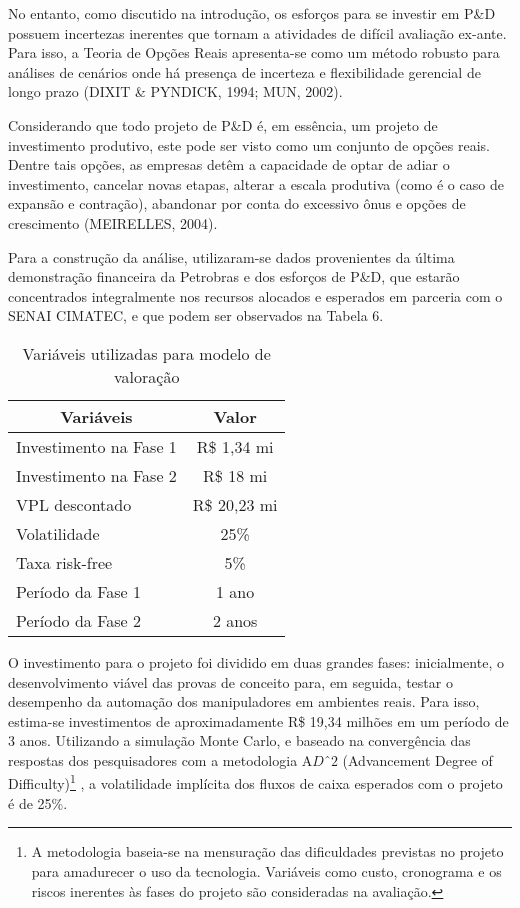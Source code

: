 No entanto, como discutido na introdução, os esforços para se investir em P\&D possuem incertezas inerentes que tornam a atividades de difícil avaliação ex-ante. Para isso, a Teoria de Opções Reais apresenta-se como um método robusto para análises de cenários onde há presença de incerteza e flexibilidade gerencial de longo prazo (DIXIT \& PYNDICK, 1994; MUN, 2002). 

Considerando que todo projeto de P\&D é, em essência, um projeto de investimento produtivo, este pode ser visto como um conjunto de opções reais. Dentre tais opções, as empresas detêm a capacidade de optar de adiar o investimento, cancelar novas etapas, alterar a escala produtiva (como é o caso de expansão e contração), abandonar por conta do excessivo ônus e opções de crescimento (MEIRELLES, 2004). 

Para a construção da análise, utilizaram-se dados provenientes da última demonstração financeira da Petrobras e dos esforços de P\&D, que estarão concentrados integralmente nos recursos alocados e esperados em parceria com o SENAI CIMATEC, e que podem ser observados na Tabela 6.

\begin{table}[h!]
	\centering
	\caption{Variáveis utilizadas para modelo de valoração}
	\label{tab:valor1}
	\def\arraystretch{1.2}
	\begin{tabular}{lc}
		\hline
		\multicolumn{1}{c}{\textbf{Variáveis}} & \textbf{Valor} \\ \hline
		Investimento na Fase 1                 & R\$ 1,34 mi    \\
		Investimento na Fase 2                 & R\$ 18 mi      \\
		VPL descontado                         & R\$ 20,23 mi   \\
		Volatilidade                           & 25\%           \\
		Taxa risk-free                         & 5\%            \\
		Período da Fase 1                      & 1 ano          \\
		Período da Fase 2                      & 2 anos         \\ \hline
	\end{tabular}
\end{table}

O investimento para o projeto foi dividido em duas grandes fases: inicialmente, o desenvolvimento viável das provas de conceito para, em seguida, testar o desempenho da automação dos manipuladores em ambientes reais. Para isso, estima-se investimentos de aproximadamente R\$ 19,34 milhões em um período de 3 anos. Utilizando a simulação Monte Carlo, e baseado na convergência das respostas dos pesquisadores com a metodologia A$Dˆ2$ (Advancement Degree of Difficulty)\footnote{A metodologia baseia-se na mensuração das dificuldades previstas no projeto para amadurecer o uso da tecnologia. Variáveis como custo, cronograma e os riscos inerentes às fases do projeto são consideradas na avaliação.} , a volatilidade implícita dos fluxos de caixa esperados com o projeto é de 25\%. 

